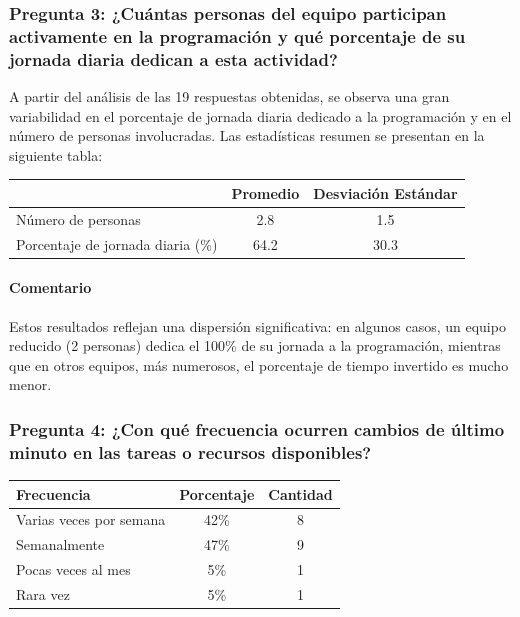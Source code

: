 \documentclass{article}
\begin{document}
\begin{appendix}
    \vspace{1.5em}
    \subsubsection*{Pregunta 3: ¿Cuántas personas del equipo participan activamente en la programación y qué porcentaje de su jornada diaria dedican a esta actividad?}
    
    A partir del análisis de las 19 respuestas obtenidas, se observa una gran variabilidad en el porcentaje de jornada diaria dedicado a la programación y en el número de personas involucradas. Las estadísticas resumen se presentan en la siguiente tabla:
    
    \begin{table}[htbp]
        \centering
        \begin{tabular}{lcc}
            \toprule
            & \textbf{Promedio} & \textbf{Desviación Estándar} \\
            \midrule
            Número de personas & 2.8 & 1.5 \\
            Porcentaje de jornada diaria (\%) & 64.2 & 30.3 \\
            \bottomrule
        \end{tabular}
        \label{tab:estadisticas_resumen_jornada}
    \end{table}
    
    \paragraph{Comentario} Estos resultados reflejan una dispersión significativa: en algunos casos, un equipo reducido (2 personas) dedica el 100\% de su jornada a la programación, mientras que en otros equipos, más numerosos, el porcentaje de tiempo invertido es mucho menor.
    
    
    \vspace{1.5em}
    \subsubsection*{Pregunta 4: ¿Con qué frecuencia ocurren cambios de último minuto en las tareas o recursos disponibles?}
    
    \begin{table}[htbp]
        \centering
        \begin{tabular}{lcc}
            \toprule
            \textbf{Frecuencia} & \textbf{Porcentaje} & \textbf{Cantidad} \\
            \midrule
            Varias veces por semana & 42\% & 8 \\
            Semanalmente & 47\% & 9 \\
            Pocas veces al mes & 5\% & 1 \\
            Rara vez & 5\% & 1 \\
            \bottomrule
        \end{tabular}
        \label{tab:cambios_ultimo_minuto}
    \end{table}
    

\end{appendix}
\end{document}
